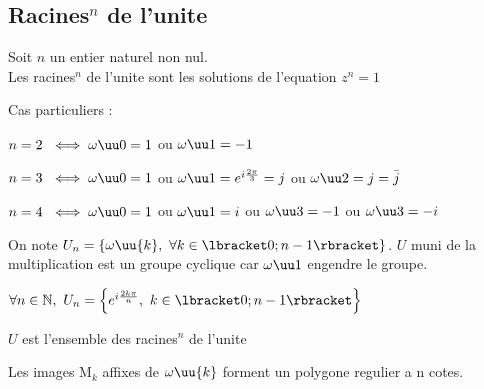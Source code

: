 \documentclass[12pt,a4paper]{article}
\begin{document}
		\subsection{Racines$^n$ de l'unite}
			\begin{defi}
				Soit $n$ un entier naturel non nul.\\
				Les racines$^n$ de l'unite sont les solutions de l'equation $z^n=1$
			\end{defi}
			Cas particuliers :
			\begin{liste}
				\item$n=2\ \iff\omega\uu0=1$ ou $\omega\uu1=-1$
				\item$n=3\ \iff\omega\uu0=1$ ou $\omega\uu1=e^{i\frac{2\pi}{3}}=j$ ou $\omega\uu2=j=\bar{j}$
				\item$n=4\ \iff\omega\uu0=1$ ou $\omega\uu1=i$ ou $\omega\uu3=-1$ ou $\omega\uu3=-i$\\
			\end{liste}
			On note $U_{n}=\left\{\omega\uu{k},\ \forall k\in\lbracket0;n-1\rbracket\right\}$. $U$ muni de la multiplication est un groupe cyclique car $\omega\uu1$ engendre le groupe.
			\begin{prop}
				\begin{liste}
					\item$\forall n\in\mathbb{N},\ U_n=\left\{e^{i\frac{2k\pi}{n}},\ k\in\lbracket0;n-1\rbracket\right\}$ \\
					\item $U$ est l'ensemble des racines$^n$ de l'unite
					\item Les images M$_k$ affixes de $\omega\uu{k}$ forment un polygone regulier a n cotes.
				\end{liste}
			\end{prop}
\end{document}
